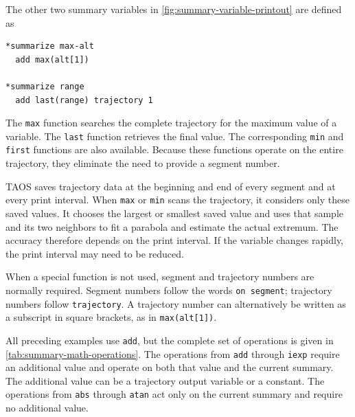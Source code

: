 The other two summary variables in \cref{fig:summary-variable-printout} are defined
as

\begin{lstlisting}[style=taosmanual]
*summarize max-alt
  add max(alt[1])

*summarize range
  add last(range) trajectory 1
\end{lstlisting}


The \texttt{max} function searches the complete trajectory for the maximum value of
a variable. The \texttt{last} function retrieves the final value. The corresponding
\texttt{min} and \texttt{first} functions are also available. Because these functions
operate on the entire trajectory, they eliminate the need to provide a segment
number.

TAOS saves trajectory data at the beginning and end of every segment and at every
print interval. When \texttt{max} or \texttt{min} scans the trajectory, it considers
only these saved values. It chooses the largest or smallest saved value and uses that
sample and its two neighbors to fit a parabola and estimate the actual extremum. The
accuracy therefore depends on the print interval. If the variable changes rapidly, the
print interval may need to be reduced.

When a special function is not used, segment and trajectory numbers are normally
required. Segment numbers follow the words \texttt{on segment}; trajectory numbers
follow \texttt{trajectory}. A trajectory number can alternatively be written as a
subscript in square brackets, as in \texttt{max(alt[1])}.


All preceding examples use \texttt{add}, but the complete set of operations is given
in \cref{tab:summary-math-operations}. The operations from \texttt{add} through
\texttt{iexp} require an additional value and operate on both that value and the
current summary. The additional value can be a trajectory output variable or a
constant. The operations from \texttt{abs} through \texttt{atan} act only on the
current summary and require no additional value.


